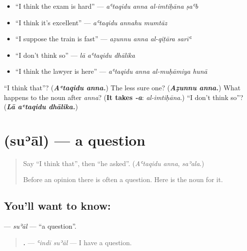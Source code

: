 \begin{itemize}
\raggedright
  \item \textquotedblleft{}I think the exam is hard\textquotedblright{} — \emph{aʿtaqidu anna al-imtiḥāna ṣaʿb}
  \item \textquotedblleft{}I think it's excellent\textquotedblright{} — \emph{aʿtaqidu annahu mumtāz}
  \item \textquotedblleft{}I suppose the train is fast\textquotedblright{} — \emph{aẓunnu anna al-qiṭāra sarīʿ}
  \item \textquotedblleft{}I don't think so\textquotedblright{} — \emph{lā aʿtaqidu dhālika}
  \item \textquotedblleft{}I think the lawyer is here\textquotedblright{} — \emph{aʿtaqidu anna al-muḥāmiya hunā}
\end{itemize}

\begin{tcolorbox}[breakable,colback=teal!4,colframe=teal!35!black,title={Before you move on}]
\textquotedblleft{}I think that\textquotedblright{}? (\emph{\textbf{Aʿtaqidu anna.}}) The less sure one? (\emph{\textbf{Aẓunnu anna.}}) What happens to the noun after \emph{anna}? (\textbf{It takes \emph{-a}}: \emph{al-imtiḥāna}.) \textquotedblleft{}I don't think so\textquotedblright{}? (\emph{\textbf{Lā aʿtaqidu dhālika.}})
\end{tcolorbox}
\section[\texorpdfstring{\ar{سؤال} (suʾāl)}{سؤال (suʾāl)}]{ (suʾāl) — a question}

\label{lesson:AR-C285-sual}



\begin{quote}
Say \textquotedblleft{}I think that\textquotedblright{}, then \textquotedblleft{}he asked\textquotedblright{}. (\emph{Aʿtaqidu anna}, \emph{saʾala}.)

Before an opinion there is often a question. Here is the noun for it.
\end{quote}

\subsection*{You'll want to know: }
\textbf{} — \emph{suʾāl} — \textquotedblleft{}a question\textquotedblright{}.

\begin{quote}
\textbf{ .} — \emph{ʿindī suʾāl} — I have a question.
\end{quote}

